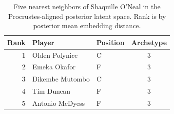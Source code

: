 \begin{table}[htbp]
  \centering\small
  \begin{tabular}{rllc}
    \toprule
    Rank & Player & Position & Archetype \\
    \midrule
    1 & Olden Polynice & C & 3 \\
    2 & Emeka Okafor & F & 3 \\
    3 & Dikembe Mutombo & C & 3 \\
    4 & Tim Duncan & F & 3 \\
    5 & Antonio McDyess & F & 3 \\
    \bottomrule
  \end{tabular}
  \caption{Five nearest neighbors of Shaquille O'Neal in the Procrustes-aligned posterior latent space. Rank is by posterior mean embedding distance.}
  \label{tab:Shaquille_O_Neal_neighbors}
\end{table}

